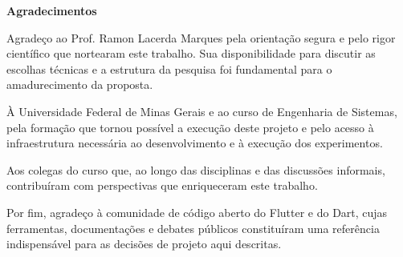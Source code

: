 
\begin{center}
\huge{{\bf Agradecimentos}}
\vspace{4cm}
\end{center}

Agradeço ao Prof. Ramon Lacerda Marques pela orientação segura e pelo rigor científico que nortearam este trabalho. Sua disponibilidade para discutir as escolhas técnicas e a estrutura da pesquisa foi fundamental para o amadurecimento da proposta.

À Universidade Federal de Minas Gerais e ao curso de Engenharia de Sistemas, pela formação que tornou possível a execução deste projeto e pelo acesso à infraestrutura necessária ao desenvolvimento e à execução dos experimentos.


Aos colegas do curso que, ao longo das disciplinas e das discussões informais, contribuíram com perspectivas que enriqueceram este trabalho.

Por fim, agradeço à comunidade de código aberto do Flutter e do Dart, cujas ferramentas, documentações e debates públicos constituíram uma referência indispensável para as decisões de projeto aqui descritas.
 
\clearpage
\thispagestyle{empty}
\cleardoublepage
